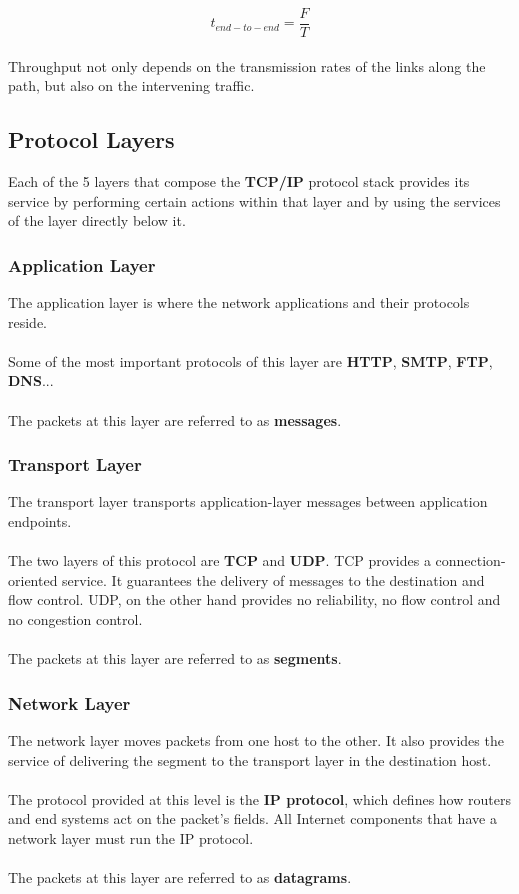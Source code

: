 \documentclass{article}
\begin{document}
	\[ t_{end-to-end} = \frac{F}{T} \] \\
Throughput not only depends on the transmission rates of the links along the path, but also on the intervening traffic.
	
\subsection{Protocol Layers}
Each of the 5 layers that compose the \textbf{TCP/IP} protocol stack provides its service by performing certain actions within that layer and by using the services of the layer directly below it.

\subsubsection{Application Layer}
The application layer is where the network applications and their protocols reside. \\ \\
Some of the most important protocols of this layer are \textbf{HTTP}, \textbf{SMTP}, \textbf{FTP}, \textbf{DNS}... \\ \\
The packets at this layer are referred to as \textbf{messages}.

\subsubsection{Transport Layer}
The transport layer transports application-layer messages between application endpoints. \\ \\
The two layers of this protocol are \textbf{TCP} and \textbf{UDP}. TCP provides a connection-oriented service. It guarantees the delivery of messages to the destination and flow control. UDP, on the other hand provides no reliability, no flow control and no congestion control. \\ \\
The packets at this layer are referred to as \textbf{segments}.

\subsubsection{Network Layer}
The network layer moves packets from one host to the other. It also provides the service of delivering the segment to the transport layer in the destination host. \\ \\
The protocol provided at this level is the \textbf{IP protocol}, which defines how routers and end systems act on the packet's fields. All Internet components that have a network layer must run the IP protocol. \\ \\
The packets at this layer are referred to as \textbf{datagrams}.
\end{document}

